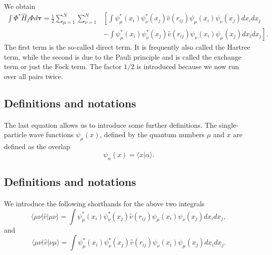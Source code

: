 \documentclass[%
twoside,                 %
final,                   %
10pt]{article}
\begin{document}
\paragraph{}
We obtain
\begin{equation}
\begin{split}
  \int \Phi^*\hat{H}_I\Phi d\mathbf{\tau} 
  = \frac{1}{2}\sum_{\mu=1}^N\sum_{\nu=1}^N
    &\left[ \int \psi_{\mu}^*(x_i)\psi_{\nu}^*(x_j)\hat{v}(r_{ij})\psi_{\mu}(x_i)\psi_{\nu}(x_j)
    dx_idx_j \right.\\
  &\left.
  - \int \psi_{\mu}^*(x_i)\psi_{\nu}^*(x_j)
  \hat{v}(r_{ij})\psi_{\nu}(x_i)\psi_{\mu}(x_j)
  dx_idx_j
  \right]. \label{H2Expectation}
\end{split}
\end{equation}
The first term is the so-called direct term. It is frequently also called the  Hartree term, 
while the second is due to the Pauli principle and is called
the exchange term or just the Fock term.
The factor  $1/2$ is introduced because we now run over
all pairs twice.



\subsection{Definitions and notations}

\paragraph{}
The last equation allows us to  introduce some further definitions.  
The single-particle wave functions $\psi_{\mu}(x)$, defined by the quantum numbers $\mu$ and $x$
are defined as the overlap 
\[
   \psi_{\alpha}(x)  = \langle x | \alpha \rangle .
\]



\subsection{Definitions and notations}

\paragraph{}
We introduce the following shorthands for the above two integrals
\[
\langle \mu\nu|\hat{v}|\mu\nu\rangle =  \int \psi_{\mu}^*(x_i)\psi_{\nu}^*(x_j)\hat{v}(r_{ij})\psi_{\mu}(x_i)\psi_{\nu}(x_j)
    dx_idx_j,
\]
and
\[
\langle \mu\nu|\hat{v}|\nu\mu\rangle = \int \psi_{\mu}^*(x_i)\psi_{\nu}^*(x_j)
  \hat{v}(r_{ij})\psi_{\nu}(x_i)\psi_{\mu}(x_j)
  dx_idx_j.  
\]
\end{document}
